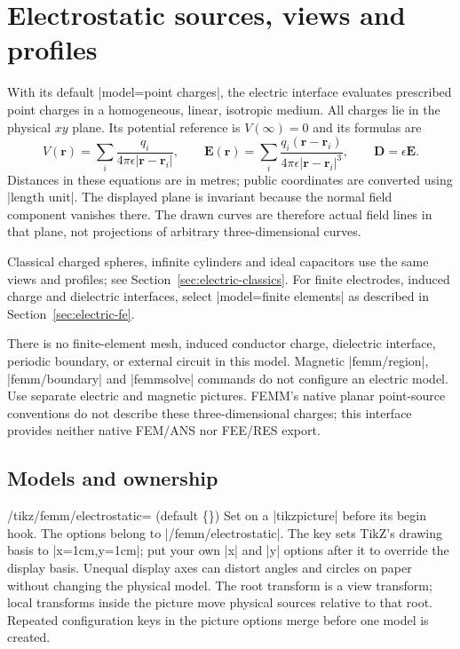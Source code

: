 \section{Electrostatic sources, views and profiles}
\label{sec:electrostatic}

With its default |model=point charges|, the electric interface evaluates prescribed point charges in a homogeneous,
linear, isotropic medium. All charges lie in the physical $xy$ plane. Its
potential reference is $V(\infty)=0$ and its formulas are
\[
 V(\mathbf r)=\sum_i\frac{q_i}{4\pi\epsilon|\mathbf r-\mathbf r_i|},\qquad
 \mathbf E(\mathbf r)=\sum_i\frac{q_i(\mathbf r-\mathbf r_i)}
 {4\pi\epsilon|\mathbf r-\mathbf r_i|^3},\qquad
 \mathbf D=\epsilon\mathbf E.
\]
Distances in these equations are in metres; public coordinates are converted
using |length unit|. The displayed plane is invariant because the normal field
component vanishes there. The drawn curves are therefore actual field lines
in that plane, not projections of arbitrary three-dimensional curves.

Classical charged spheres, infinite cylinders and ideal capacitors use the
same views and profiles; see Section~\ref{sec:electric-classics}.
For finite electrodes, induced charge and dielectric interfaces, select
|model=finite elements| as described in Section~\ref{sec:electric-fe}.

There is no finite-element mesh, induced conductor charge, dielectric interface,
periodic boundary, or external circuit in this model. Magnetic |femm/region|,
|femm/boundary| and |femmsolve| commands do not configure an electric model.
Use separate electric and magnetic pictures. FEMM's native planar point-source
conventions do not describe these three-dimensional charges; this interface
provides neither native FEM/ANS nor FEE/RES export.

\subsection{Models and ownership}
\label{sec:electric-model}
\begin{key}{/tikz/femm/electrostatic= (default \{\})}
Set on a |tikzpicture| before its begin hook. The options belong to
|/femm/electrostatic|. The key sets TikZ's drawing basis to |x=1cm,y=1cm|;
put your own |x| and |y| options after it to override the display basis.
Unequal display axes can distort angles and circles on paper without changing
the physical model. The root transform is a view transform; local transforms inside the picture
move physical sources relative to that root. Repeated configuration keys in the
picture options merge before one model is created.
\end{key}

